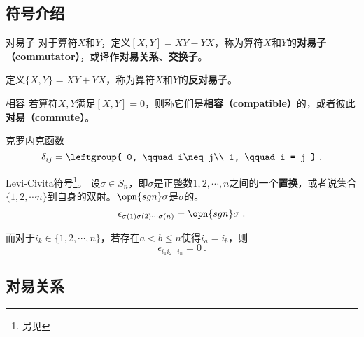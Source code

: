 


\subsection{符号介绍}

\begin{definition}{对易子}\label{def_ComOpQ_13}
对于算符$X$和$Y$，定义$[X, Y]=XY-YX$，称为算符$X$和$Y$的\textbf{对易子（commutator）}，或译作\textbf{对易关系}、\textbf{交换子}。

定义$\{X, Y\}=XY+YX$，称为算符$X$和$Y$的\textbf{反对易子}。
\end{definition}


\begin{definition}{相容}\label{def_ComOpQ_17}
若算符$X, Y$满足$[X, Y]=0$，则称它们是\textbf{相容（compatible）}的，或者彼此\textbf{对易（commute）}。
\end{definition}



\begin{definition}{克罗内克函数}
\begin{equation}
\delta_{ij} = \leftgroup{
    0, \qquad i\neq j\\
    1, \qquad i = j
}~.
\end{equation}
\end{definition}




\begin{definition}{Levi-Civita符号\footnote{另见}。}
设$\sigma\in S_n$，即$\sigma$是正整数$1, 2, \cdots, n$之间的一个\textbf{置换}，或者说集合$\{1, 2, \cdots n\}$到自身的双射。$\opn{sgn}\sigma$是$\sigma$的。
\begin{equation}
\epsilon_{\sigma(1) \sigma(2) \cdots \sigma(n)}=\opn{sgn}\sigma~.
\end{equation}

而对于$i_k\in\{1, 2, \cdots, n\}$，若存在$a<b\leq n$使得$i_a=i_b$，则
\begin{equation}
\epsilon_{i_1 i_2 \cdots i_n} = 0~.
\end{equation}

\end{definition}


\subsection{对易关系}


